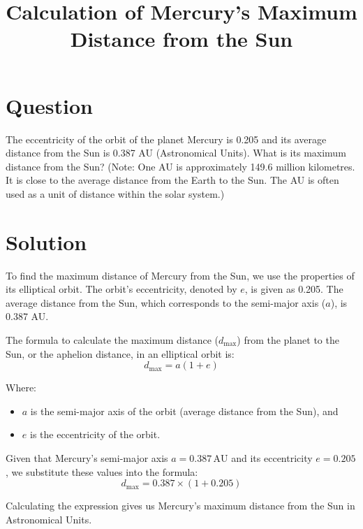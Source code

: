 \documentclass{article}
\begin{document}
\title{Calculation of Mercury's Maximum Distance from the Sun}
\date{}
\maketitle

\section*{Question}
The eccentricity of the orbit of the planet Mercury is 0.205 and its average distance from the Sun is 0.387 AU (Astronomical Units). What is its maximum distance from the Sun? (Note: One AU is approximately 149.6 million kilometres. It is close to the average distance from the Earth to the Sun. The AU is often used as a unit of distance within the solar system.)

\section*{Solution}
To find the maximum distance of Mercury from the Sun, we use the properties of its elliptical orbit. The orbit's eccentricity, denoted by \(e\), is given as 0.205. The average distance from the Sun, which corresponds to the semi-major axis (\(a\)), is 0.387 AU.

The formula to calculate the maximum distance (\(d_{\text{max}}\)) from the planet to the Sun, or the aphelion distance, in an elliptical orbit is:
\[ d_{\text{max}} = a(1 + e) \]

Where:
\begin{itemize}
    \item \(a\) is the semi-major axis of the orbit (average distance from the Sun), and
    \item \(e\) is the eccentricity of the orbit.
\end{itemize}

Given that Mercury's semi-major axis \(a = 0.387 \, \text{AU}\) and its eccentricity \(e = 0.205\), we substitute these values into the formula:
\[ d_{\text{max}} = 0.387 \times (1 + 0.205) \]

Calculating the expression gives us Mercury's maximum distance from the Sun in Astronomical Units.
\end{document}
